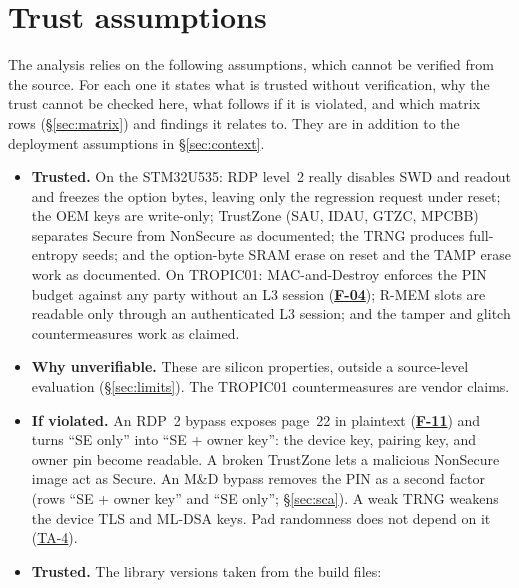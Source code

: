 \documentclass[11pt,a4paper]{article}
\newcommand{\fid}[1]{\textbf{#1}}
\begin{document}
\section{Trust assumptions}\label{sec:trust}
The analysis relies on the following assumptions, which cannot be verified from the source. For each one it states what is trusted without verification, why the trust cannot be checked here, what follows if it is violated, and which matrix rows (\S\ref{sec:matrix}) and findings it relates to. They are in addition to the deployment assumptions in \S\ref{sec:context}.
\begin{description}[style=nextline,leftmargin=1.2em]
\item[TA-1 Hardware vendors]\label{ta:TA-1}
\begin{itemize}
\item \textbf{Trusted.} On the STM32U535: RDP level~2 really disables SWD and readout and freezes the option bytes, leaving only the  regression request under reset; the OEM keys are write-only; TrustZone (SAU, IDAU, GTZC, MPCBB) separates Secure from NonSecure as documented; the TRNG produces full-entropy seeds; and the option-byte SRAM erase on reset and the TAMP erase work as documented. On TROPIC01: MAC-and-Destroy enforces the PIN budget against any party without an L3 session (\hyperref[f:F-04]{\fid{F-04}}); R-MEM slots are readable only through an authenticated L3 session; and the tamper and glitch countermeasures work as claimed.
\item \textbf{Why unverifiable.} These are silicon properties, outside a source-level evaluation (\S\ref{sec:limits}). The TROPIC01 countermeasures are vendor claims.
\item \textbf{If violated.} An RDP~2 bypass exposes page~22 in plaintext (\hyperref[f:F-11]{\fid{F-11}}) and turns ``SE only'' into ``SE + owner key'': the device key, pairing key, and owner pin become readable. A broken TrustZone lets a malicious NonSecure image act as Secure. An M\&D bypass removes the PIN as a second factor (rows ``SE + owner key'' and ``SE only''; \S\ref{sec:sca}). A weak TRNG weakens the device TLS and ML-DSA keys. Pad randomness does not depend on it (\hyperref[ta:TA-4]{TA-4}).
\end{itemize}
\item[TA-2 Third-party libraries]\label{ta:TA-2}
\begin{itemize}
\item \textbf{Trusted.} The library versions taken from the build files:

\end{itemize}
\end{description}
\end{document}
